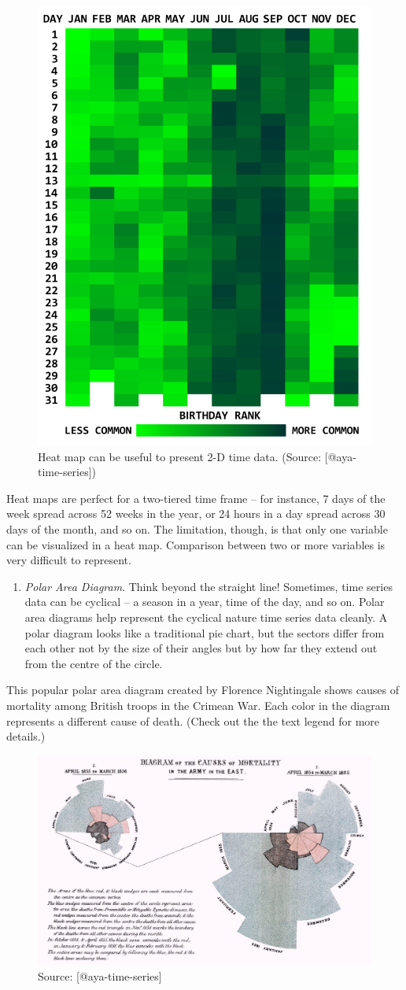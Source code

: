 \documentclass[]{book}
\providecommand{\tightlist}{%
  \setlength{\itemsep}{0pt}\setlength{\parskip}{0pt}}
\theoremstyle{definition}
\theoremstyle{definition}
\theoremstyle{definition}
\theoremstyle{remark}
\begin{document}
\begin{figure}

{\centering \includegraphics[width=0.4\linewidth]{images/aya-heat-map} 

}

\caption{Heat map can be useful to present 2-D time data. (Source: [@aya-time-series])}\label{fig:aya-heat-map}
\end{figure}

Heat maps are perfect for a two-tiered time frame -- for instance, 7
days of the week spread across 52 weeks in the year, or 24 hours in a
day spread across 30 days of the month, and so on. The limitation,
though, is that only one variable can be visualized in a heat map.
Comparison between two or more variables is very difficult to represent.

\begin{enumerate}
\def\labelenumi{\arabic{enumi}.}
\setcounter{enumi}{6}
\tightlist
\item
  \emph{Polar Area Diagram}. Think beyond the straight line! Sometimes,
  time series data can be cyclical -- a season in a year, time of the
  day, and so on. Polar area diagrams help represent the cyclical nature
  time series data cleanly. A polar diagram looks like a traditional pie
  chart, but the sectors differ from each other not by the size of their
  angles but by how far they extend out from the centre of the circle.
\end{enumerate}

This popular polar area diagram created by Florence Nightingale shows
causes of mortality among British troops in the Crimean War. Each color
in the diagram represents a different cause of death. (Check out the the
text legend for more details.)

\begin{figure}

{\centering \includegraphics[width=0.5\linewidth]{images/aya-polar} 

}

\caption{Source: [@aya-time-series]}\label{fig:aya-polar}
\end{figure}
\end{document}
